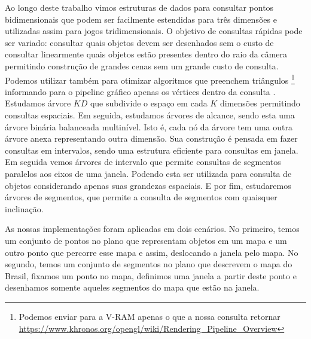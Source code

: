 Ao longo deste trabalho vimos estruturas de dados para consultar pontos bidimensionais que podem ser facilmente estendidas para três dimensões e utilizadas assim para jogos tridimensionais. O objetivo de consultas rápidas pode ser variado: consultar quais objetos devem ser desenhados sem o custo de consultar linearmente quais objetos estão presentes dentro do raio da câmera permitindo construção de grandes cenas sem um grande custo de consulta. Podemos utilizar também para otimizar algoritmos que preenchem triângulos \footnote{Podemos enviar para a V-RAM apenas o que a nossa consulta retornar \url{https://www.khronos.org/opengl/wiki/Rendering_Pipeline_Overview}} informando para o pipeline gráfico apenas os vértices dentro da consulta \cite{opengl}. Estudamos árvore $KD$ que subdivide o espaço em cada $K$ dimensões permitindo consultas espaciais.%
Em seguida, estudamos árvores de alcance, sendo esta uma árvore binária balanceada multinível. Isto é, cada nó da árvore tem uma outra árvore anexa representando outra dimensão. Sua construção é pensada em fazer consultas em intervalos, sendo uma estrutura eficiente para consultas em janela. Em seguida vemos árvores de intervalo que permite consultas de segmentos paralelos aos eixos de uma janela. Podendo esta ser utilizada para consulta de objetos considerando apenas suas grandezas espaciais. E por fim, estudaremos árvores de segmentos, que permite a consulta de segmentos com quaisquer inclinação. %

As nossas implementações foram aplicadas em dois cenários. No primeiro, temos um conjunto de pontos no plano que representam objetos em um mapa e um outro ponto que percorre esse mapa e assim, deslocando a janela pelo mapa. No segundo, temos um conjunto de segmentos no plano que descrevem o mapa do Brasil, fixamos um ponto no mapa, definimos uma janela a partir deste ponto e desenhamos somente aqueles segmentos do mapa que estão na janela.


